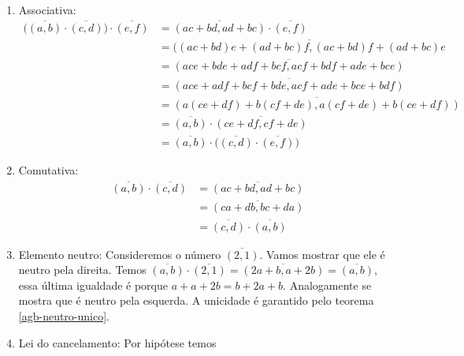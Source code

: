\documentclass[../main.tex]{subfiles}
\begin{document}
\begin{dem}
    \begin{enumerate}[label=(\roman*)]
        \item Associativa: 
        \begin{align*}
            \big(\overline{(a,b)} \cdot \overline{(c,d)}\big) \cdot  \overline{(e,f)} &= \overline{(ac+bd, ad+bc)} \cdot \overline{(e,f)} \\
            &= \overline{((ac+bd)e + (ad+bc)f , (ac+bd)f + (ad+bc)e} \\
            &= \overline{(ace+bde+adf+bcf, acf+bdf+ade+bce)} \\
            &= \overline{(ace+adf+bcf+bde, acf+ade+bce+bdf)} \\
            &= \overline{(a(ce+df) + b(cf+de) , a(cf+de) + b(ce+df))} \\
            &= \overline{(a,b)} \cdot \overline{(ce+df, cf+de)} \\
            &= \overline{(a,b)} \cdot \big( \overline{(c,d)} \cdot \overline{(e,f)} \big)
        \end{align*}
        
        
        \item Comutativa: 
        \begin{align*}
            \overline{(a,b)} \cdot \overline{(c,d)} &= \overline{(ac+bd, ad+bc)} \\
            &= \overline{(ca+db, bc+da)} \\
            &= \overline{(c,d)} \cdot \overline{(a,b)}            
        \end{align*}

        \item Elemento neutro: Consideremos o número $\overline{(2,1)}$. Vamos mostrar que ele é neutro pela direita. Temos $\overline{(a,b)} \cdot \overline{(2,1)} = \overline{(2a+b, a+2b)} = \overline{(a,b)}$, essa última igualdade é porque $a + a + 2b = b + 2a + b$. Analogamente se mostra que é neutro pela esquerda. A unicidade é garantido pelo teorema \ref{agb-neutro-unico}.
        
        \item Lei do cancelamento: Por hipótese temos 
        

\end{enumerate}
\end{dem}
\end{document}
